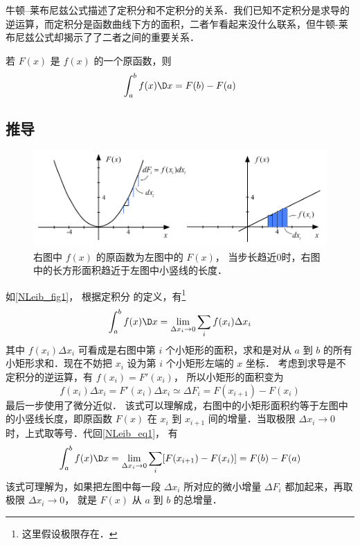 

牛顿--莱布尼兹公式描述了定积分和不定积分的关系．我们已知不定积分是求导的逆运算，而定积分是函数曲线下方的面积，二者乍看起来没什么联系，但牛顿-莱布尼兹公式却揭示了了二者之间的重要关系．

若 $F(x)$ 是 $f(x)$ 的一个原函数，则
\begin{equation}\label{NLeib_eq1}
\int_a^b {f(x)\D x}  = F(b) - F(a)
\end{equation}

\subsection{推导}
\begin{figure}[h]
\centering
\includegraphics[width=13cm]{./figures/NLeib.pdf}
\caption{右图中 $f(x)$ 的原函数为左图中的 $F(x)$， 当步长趋近0时，右图中的长方形面积趋近于左图中小竖线的长度．}\label{NLeib_fig1}
\end{figure}

如\autoref{NLeib_fig1}， 根据定积分 的定义，有\footnote{这里假设极限存在．}
\begin{equation}
\int_a^b f(x)\D x= \lim\limits_{\Delta x_i\to 0}\sum\limits_i f(x_i)\Delta x_i
\end{equation}
其中 $f(x_i)\Delta x_i$ 可看成是右图中第 $i$ 个小矩形的面积，求和是对从 $a$ 到 $b$ 的所有小矩形求和．现在不妨把 $x_i$ 设为第 $i$ 个小矩形左端的 $x$ 坐标． 考虑到求导是不定积分的逆运算，有 $f(x_i)=F'(x_i)$， 所以小矩形的面积变为
\begin{equation}
f(x_i)\Delta x_i = F'(x_i)\Delta x_i \simeq \Delta F_i = F(x_{i+1})-F(x_i)
\end{equation}
最后一步使用了微分近似． %
该式可以理解成，右图中的小矩形面积约等于左图中的小竖线长度，即原函数 $F(x)$ 在 $x_i$ 到 $x_{i+1}$ 间的增量．当取极限 $\Delta x_i \to 0$ 时，上式取等号．代回\autoref{NLeib_eq1}， 有
\begin{equation}
\int_a^b f(x)\D x= \lim\limits_{\Delta x_i\to 0}\sum\limits_i [F(x_{i+1})-F(x_i)] = F(b)-F(a)
\end{equation}
该式可理解为，如果把左图中每一段 $\Delta x_i$ 所对应的微小增量 $\Delta F_i$ 都加起来，再取极限 $\Delta x_i \to 0$， 就是 $F(x)$ 从 $a$ 到 $b$ 的总增量．


